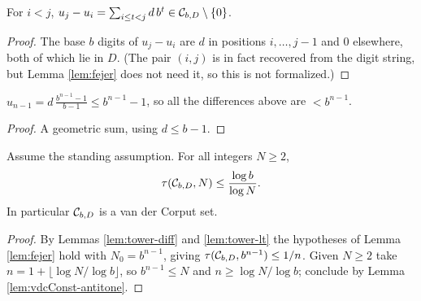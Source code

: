 \begin{lemma}
  \label{lem:tower-diff}
  \leanok
  For $i < j$, $u_j - u_i = \sum_{i \leq t < j} d\, b^t \in \mathcal{C}_{b,D} \setminus
  \{0\}$.
\end{lemma}
\begin{proof}
  \leanok
  The base $b$ digits of $u_j - u_i$ are $d$ in positions $i, \ldots, j-1$ and
  $0$ elsewhere, both of which lie in $D$. (The pair $(i,j)$ is in fact
  recovered from the digit string, but Lemma \ref{lem:fejer} does not need it,
  so this is not formalized.)
\end{proof}

\begin{lemma}
  \label{lem:tower-lt}
  \leanok
  $u_{n-1} = d\,\frac{b^{n-1} - 1}{b-1} \leq b^{n-1} - 1$, so all the
  differences above are $< b^{n-1}$.
\end{lemma}
\begin{proof}
  \leanok
  A geometric sum, using $d \leq b-1$.
\end{proof}

\begin{theorem}[Proposition 3.3]
  \label{thm:logSavings}
  \leanok
  Assume the standing assumption. For all integers $N \geq 2$,
  \[
    \tau(\mathcal{C}_{b,D}, N) \leq \frac{\log b}{\log N} .
  \]
  In particular $\mathcal{C}_{b,D}$ is a van der Corput set.
\end{theorem}
\begin{proof}
  \leanok
  By Lemmas \ref{lem:tower-diff} and \ref{lem:tower-lt} the hypotheses of
  Lemma \ref{lem:fejer} hold with $N_0 = b^{n-1}$, giving
  $\tau(\mathcal{C}_{b,D}, b^{n-1}) \leq 1/n$. Given $N \geq 2$ take
  $n = 1 + \lfloor \log N / \log b \rfloor$, so $b^{n-1} \leq N$ and
  $n \geq \log N / \log b$; conclude by Lemma \ref{lem:vdcConst-antitone}.
\end{proof}

